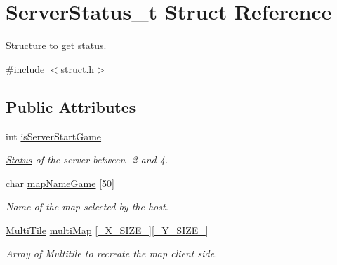 \hypertarget{struct_server_status__t}{}\section{Server\+Status\+\_\+t Struct Reference}
\label{struct_server_status__t}


Structure to get status.  




{\ttfamily \#include $<$struct.\+h$>$}

\subsection*{Public Attributes}
\begin{DoxyCompactItemize}
\item 
\mbox{\label{struct_server_status__t_a0800819f9f48cda4a3b61643f131f401}} 
int \hyperlink{struct_server_status__t_a0800819f9f48cda4a3b61643f131f401}{is\+Server\+Start\+Game}
\begin{DoxyCompactList}\small\item\em \hyperlink{struct_status}{Status} of the server between -\/2 and 4. \end{DoxyCompactList}\item 
\mbox{\label{struct_server_status__t_a7c543ecd820e938afe93374dc52e736b}} 
char \hyperlink{struct_server_status__t_a7c543ecd820e938afe93374dc52e736b}{map\+Name\+Game} \mbox{[}50\mbox{]}
\begin{DoxyCompactList}\small\item\em Name of the map selected by the host. \end{DoxyCompactList}\item 
\mbox{\label{struct_server_status__t_aee084fee1ff6b0310f26af75ec832816}} 
\hyperlink{struct_multi_tile}{Multi\+Tile} \hyperlink{struct_server_status__t_aee084fee1ff6b0310f26af75ec832816}{multi\+Map} \mbox{[}\hyperlink{common_8h_af255265266c7bffd8e2b3526038636ea}{\+\_\+\+X\+\_\+\+S\+I\+Z\+E\+\_\+}\mbox{]}\mbox{[}\hyperlink{common_8h_aa319b11913fc00b38adf54ee0b56ae09}{\+\_\+\+Y\+\_\+\+S\+I\+Z\+E\+\_\+}\mbox{]}
\begin{DoxyCompactList}\small\item\em Array of Multitile to recreate the map client side. \end{DoxyCompactList}\end{DoxyCompactItemize}


